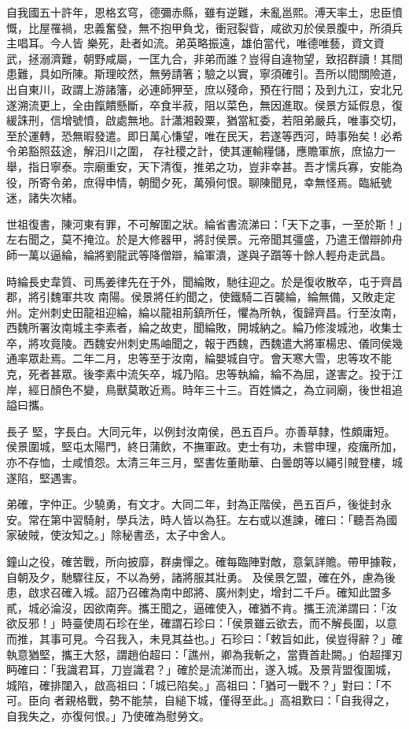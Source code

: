 \begin{pinyinscope}
 自我國五十許年，恩格玄穹，德彌赤縣，雖有逆難，未亂邕熙。溥天率土，忠臣憤慨，比屋罹禍，忠義奮發，無不抱甲負戈，衝冠裂眥，咸欲刃於侯景腹中，所須兵主唱耳。今人皆
 樂死，赴者如流。弟英略振遠，雄伯當代，唯德唯藝，資文資武，拯溺濟難，朝野咸屬，一匡九合，非弟而誰？豈得自違物望，致招群讀！其間患難，具如所陳。斯理皎然，無勞請箸；驗之以實，寧須確引。吾所以間關險道，出自東川，政謂上游諸籓，必連師狎至，庶以殘命，預在行間；及到九江，安北兄遂溯流更上，全由餼饋懸斷，卒食半菽，阻以菜色，無因進取。侯景方延假息，復緩誅刑，信增號憤，啟處無地。計瀟湘穀粟，猶當紅委，若阻弟嚴兵，唯事交切，至於運轉，恐無暇發遣。即日萬心慊望，唯在民天，若遂等西河，時事殆矣！必希令弟豁照茲途，解汨川之圍，
 存社稷之計，使其運輸糧儲，應贍軍旅，庶協力一舉，指日寧泰。宗廟重安，天下清復，推弟之功，豈非幸甚。吾才懦兵寡，安能為役，所寄令弟，庶得申情，朝聞夕死，萬殞何恨。聊陳聞見，幸無怪焉。臨紙號迷，諸失次緒。



 世祖復書，陳河東有罪，不可解圍之狀。綸省書流涕曰：「天下之事，一至於斯！」左右聞之，莫不掩泣。於是大修器甲，將討侯景。元帝聞其彊盛，乃遣王僧辯帥舟師一萬以逼綸，綸將劉龍武等降僧辯，綸軍潰，遂與子躓等十餘人輕舟走武昌。



 時綸長史韋質、司馬姜律先在于外，聞綸敗，馳往迎之。於是復收散卒，屯于齊昌郡，將引魏軍共攻
 南陽。侯景將任約聞之，使鐵騎二百襲綸，綸無備，又敗走定州。定州刺史田龍祖迎綸，綸以龍祖荊鎮所任，懼為所執，復歸齊昌。行至汝南，西魏所署汝南城主李素者，綸之故吏，聞綸敗，開城納之。綸乃修浚城池，收集士卒，將攻竟陵。西魏安州刺史馬岫聞之，報于西魏，西魏遣大將軍楊忠、儀同侯幾通率眾赴焉。二年二月，忠等至于汝南，綸嬰城自守。會天寒大雪，忠等攻不能克，死者甚眾。後李素中流矢卒，城乃陷。忠等執綸，綸不為屈，遂害之。投于江岸，經日顏色不變，鳥獸莫敢近焉。時年三十三。百姓憐之，為立祠廟，後世祖追謚曰攜。



 長子
 堅，字長白。大同元年，以例封汝南侯，邑五百戶。亦善草隸，性頗庸短。侯景圍城，堅屯太陽門，終日蒲飲，不撫軍政。吏士有功，未嘗申理，疫癘所加，亦不存恤，士咸憤怨。太清三年三月，堅書佐董勛華、白曇朗等以繩引賊登樓，城遂陷，堅遇害。



 弟確，字仲正。少驍勇，有文才。大同二年，封為正階侯，邑五百戶，後徙封永安。常在第中習騎射，學兵法，時人皆以為狂。左右或以進諫，確曰：「聽吾為國家破賊，使汝知之。」除秘書丞，太子中舍人。



 鐘山之役，確苦戰，所向披靡，群虜憚之。確每臨陣對敵，意氣詳贍。帶甲據鞍，自朝及夕，馳驟往反，不以為勞，諸將服其壯勇。
 及侯景乞盟，確在外，慮為後患，啟求召確入城。詔乃召確為南中郎將、廣州刺史，增封二千戶。確知此盟多貳，城必淪沒，因欲南奔。攜王聞之，逼確使入，確猶不肯。攜王流涕謂曰：「汝欲反邪！」時臺使周石珍在坐，確謂石珍曰：「侯景雖云欲去，而不解長圍，以意而推，其事可見。今召我入，未見其益也。」石珍曰：「敕旨如此，侯豈得辭？」確執意猶堅，攜王大怒，謂趙伯超曰：「譙州，卿為我斬之，當賚首赴闕。」伯超揮刃眄確曰：「我識君耳，刀豈識君？」確於是流涕而出，遂入城。及景背盟復圍城，城陷，確排闥入，啟高祖曰：「城已陷矣。」高祖曰：「猶可一戰不？」對曰：「不可。臣向
 者親格戰，勢不能禁，自縋下城，僅得至此。」高祖歎曰：「自我得之，自我失之，亦復何恨。」乃使確為慰勞文。




\end{pinyinscope}
